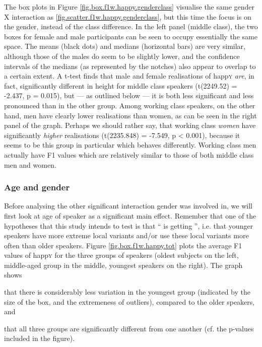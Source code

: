 The box plots in Figure \ref{fig.box.f1w.happy.genderclass} visualise the same gender X  interaction as \ref{fig.scatter.f1w.happy.genderclass}, but this time the focus is on the gender, instead of the class difference.
In the left panel (middle class), the two boxes for female and male participants can be seen to occupy essentially the same space.
The means (black dots) and medians (horizontal bars) are very similar, although those of the males do seem to be slightly lower, and the confidence intervals of the medians (as represented by the notches) also appear to overlap to a certain extent.
A t-test finds that male and female realisations of happ\textsc{y} \emph{are}, in fact, significantly different in height for middle class speakers (t(2249.52) = -2.437, p = 0.015), but --- as outlined below --- it is both less significant and less pronounced than in the other group.
Among working class speakers, on the other hand, men have clearly lower realisations than women, as can be seen in the right panel of the graph.
Perhaps we should rather say, that working class \emph{women} have significantly \emph{higher} realisations (t(2235.848) = -7.549, p < 0.001), because it seems to be this group in particular which behaves differently.
Working class men actually have F1 values which are relatively similar to those of both middle class men and women.

\subsubsection{Age and gender}
\label{sec.prod.res.vow.happy.f1.agegender}

Before analysing the other significant interaction gender was involved in, we will first look at age of speaker as a significant main effect.
Remember that one of the hypotheses that this study intends to test is that `` is getting '', i.e. that younger speakers have more extreme local variants and/or use these local variants more often than older speakers.
Figure \ref{fig.box.f1w.happy.tot} plots the average F1 values of happ\textsc{y} for the three groups of speakers (oldest subjects on the left, middle-aged group in the middle, youngest speakers on the right).
The graph shows
\begin{inparaenum}[(a)]
	\item that there is considerably less variation in the youngest group (indicated by the size of the box, and the extremeness of outliers), compared to the older speakers, and
	\item that all three groups are significantly different from one another (cf. the p-values included in the figure).
\end{inparaenum}

